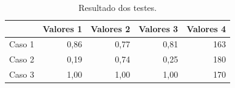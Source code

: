 \begin{table}[!htb]
  \centering
  \caption[Resultado dos testes]{Resultado dos testes.
    \label{tab:tabela-exemplo1}}
  \begin{tabular}{rrrrr}
    \toprule
           & Valores 1 & Valores 2 & Valores 3 & Valores 4 \\
    \midrule
    Caso 1 & 0,86      & 0,77      & 0,81      & 163       \\
    Caso 2 & 0,19      & 0,74      & 0,25      & 180       \\
    Caso 3 & 1,00      & 1,00      & 1,00      & 170       \\
    \bottomrule
  \end{tabular}
\end{table}
